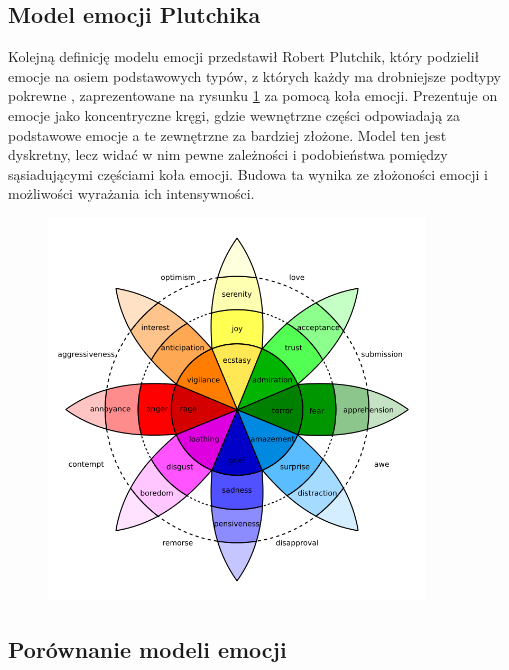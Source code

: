 \subsection{Model emocji Plutchika}

Kolejną definicję modelu emocji przedstawił Robert Plutchik, który podzielił emocje na osiem podstawowych typów, z których każdy ma drobniejsze podtypy pokrewne \cite{plutchik1982psychoevolutionary}, zaprezentowane na rysunku \ref{rys:plutchik_wheel} za pomocą koła emocji. Prezentuje on emocje jako koncentryczne kręgi, gdzie wewnętrzne części odpowiadają za podstawowe emocje a te zewnętrzne za bardziej złożone. Model ten jest dyskretny, lecz widać w nim pewne zależności i podobieństwa pomiędzy sąsiadującymi częściami koła emocji. Budowa ta wynika ze złożoności emocji i możliwości wyrażania ich intensywności.

\begin{figure}[t]
\centering\includegraphics[width=10cm]{figures/plutchik-wheel.png}
\label{rys:plutchik_wheel}
\end{figure}

\subsection{Porównanie modeli emocji}

